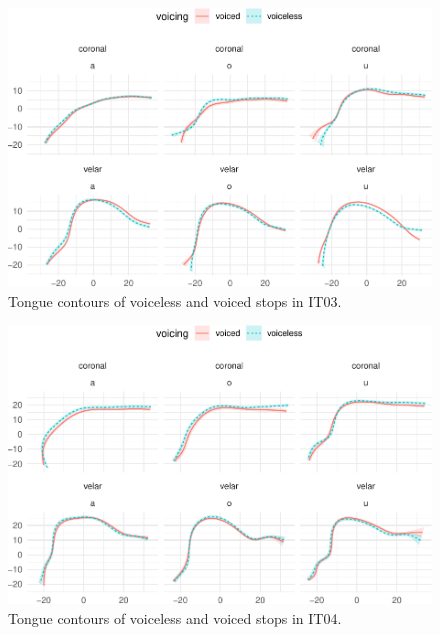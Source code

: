 \documentclass[12pt,]{article}
\begin{document}
\begin{figure}

{\centering \includegraphics[width=.8\textwidth]{2018-polar-gam_files/figure-latex/tongues-it03-1} 

}

\caption{Tongue contours of voiceless and voiced stops in IT03.}\label{f:tongues-it03}
\end{figure}

\begin{figure}

{\centering \includegraphics[width=.8\textwidth]{2018-polar-gam_files/figure-latex/tongues-it04-1} 

}

\caption{Tongue contours of voiceless and voiced stops in IT04.}\label{f:tongues-it04}
\end{figure}
\end{document}
